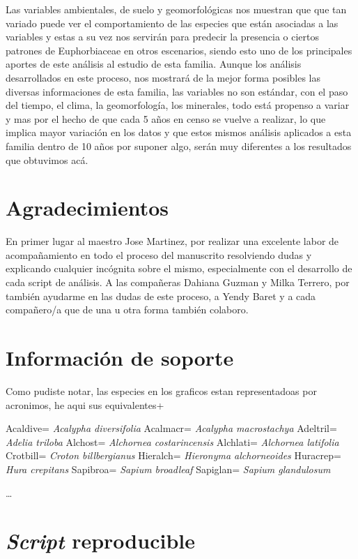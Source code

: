 \documentclass[11pt,]{article}
\begin{document}
Las variables ambientales, de suelo y geomorfológicas nos muestran que
que tan variado puede ver el comportamiento de las especies que están
asociadas a las variables y estas a su vez nos servirán para predecir la
presencia o ciertos patrones de Euphorbiaceae en otros escenarios,
siendo esto uno de los principales aportes de este análisis al estudio
de esta familia. Aunque los análisis desarrollados en este proceso, nos
mostrará de la mejor forma posibles las diversas informaciones de esta
familia, las variables no son estándar, con el paso del tiempo, el
clima, la geomorfología, los minerales, todo está propenso a variar y
mas por el hecho de que cada 5 años en censo se vuelve a realizar, lo
que implica mayor variación en los datos y que estos mismos análisis
aplicados a esta familia dentro de 10 años por suponer algo, serán muy
diferentes a los resultados que obtuvimos acá.

\section{Agradecimientos}\label{agradecimientos}

En primer lugar al maestro Jose Martinez, por realizar una excelente
labor de acompañamiento en todo el proceso del manuscrito resolviendo
dudas y explicando cualquier incógnita sobre el mismo, especialmente con
el desarrollo de cada script de análisis. A las compañeras Dahiana
Guzman y Milka Terrero, por también ayudarme en las dudas de este
proceso, a Yendy Baret y a cada compañero/a que de una u otra forma
también colaboro.

\section{Información de soporte}\label{informaciuxf3n-de-soporte}

Como pudiste notar, las especies en los graficos estan representadoas
por acronimos, he aqui sus equivalentes+

Acaldive= \emph{Acalypha diversifolia} Acalmacr= \emph{Acalypha
macrostachya} Adeltril= \emph{Adelia triloba} Alchost= \emph{Alchornea
costarincensis} Alchlati= \emph{Alchornea latifolia} Crotbill=
\emph{Croton billbergianus} Hieralch= \emph{Hieronyma alchorneoides}
Huracrep= \emph{Hura crepitans} Sapibroa= \emph{Sapium broadleaf}
Sapiglan= \emph{Sapium glandulosum}

\ldots

\section{\texorpdfstring{\emph{Script}
reproducible}{Script reproducible}}\label{script-reproducible}
\end{document}

